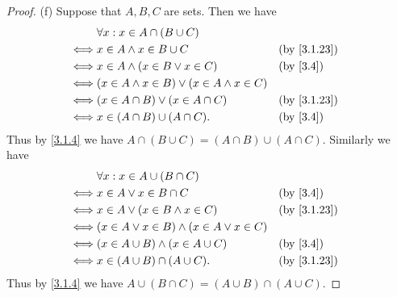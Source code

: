 \begin{proof}{(f)}
  Suppose that \(A, B, C\) are sets.
  Then we have
  \begin{align*}
         & \forall x : x \in A \cap (B \cup C)                                              \\
    \iff & x \in A \land x \in B \cup C                         &  & \by{3.1.23}            \\
    \iff & x \in A \land (x \in B \lor x \in C)                 &  & \text{(by \cref{3.4})} \\
    \iff & (x \in A \land x \in B) \lor (x \in A \land x \in C)                             \\
    \iff & (x \in A \cap B) \lor (x \in A \cap C)               &  & \by{3.1.23}            \\
    \iff & x \in (A \cap B) \cup (A \cap C).                    &  & \text{(by \cref{3.4})}
  \end{align*}
  Thus by \cref{3.1.4} we have \(A \cap (B \cup C) = (A \cap B) \cup (A \cap C)\).
  Similarly we have
  \begin{align*}
         & \forall x : x \in A \cup (B \cap C)                                             \\
    \iff & x \in A \lor x \in B \cap C                         &  & \text{(by \cref{3.4})} \\
    \iff & x \in A \lor (x \in B \land x \in C)                &  & \by{3.1.23}            \\
    \iff & (x \in A \lor x \in B) \land (x \in A \lor x \in C)                             \\
    \iff & (x \in A \cup B) \land (x \in A \cup C)             &  & \text{(by \cref{3.4})} \\
    \iff & x \in (A \cup B) \cap (A \cup C).                   &  & \by{3.1.23}
  \end{align*}
  Thus by \cref{3.1.4} we have \(A \cup (B \cap C) = (A \cup B) \cap (A \cup C)\).
\end{proof}

